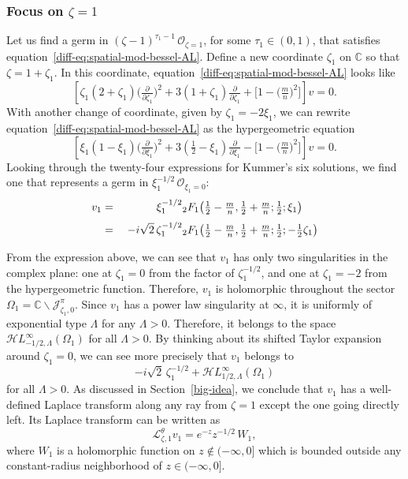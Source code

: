 \documentclass{article}
\newcommand{\singexp}[2]{\mathcal{H}L^\infty_{#1, #2}}
\newcommand{\C}{\mathbb{C}}
\newcommand{\laplace}{\mathcal{L}}
\theoremstyle{definition}
\theoremstyle{plain}
\begin{document}
\subsubsection{Focus on $\zeta = 1$}\label{pos-root-AL}
%
Let us find a germ in $(\zeta-1)^{\tau_1-1}\,\mathcal{O}_{\zeta=1}$, for some $\tau_1 \in (0, 1)$, that satisfies equation~\eqref{diff-eq:spatial-mod-bessel-AL}. Define a new coordinate $\zeta_1$ on $\C$ so that $\zeta = 1 + \zeta_1$. In this coordinate, equation~\eqref{diff-eq:spatial-mod-bessel-AL} looks like
\begin{equation}\label{diff-eq:spatial-mod-bessel-pos-AL}
\left[\zeta_1(2 + \zeta_1) \big(\tfrac{\partial}{\partial \zeta_1}\big)^2 + 3(1 + \zeta_1) \tfrac{\partial}{\partial \zeta_1} + \big[1 - \big(\tfrac{m}{n}\big)^2\big]\right] v = 0.
\end{equation}
With another change of coordinate, given by $\zeta_1 = -2\xi_1$, we can rewrite equation~\eqref{diff-eq:spatial-mod-bessel-AL} as the hypergeometric equation
\begin{equation}\label{diff-eq:hypergeom-pos-AL}
\left[\xi_1 (1 - \xi_1) \big(\tfrac{\partial}{\partial \xi_1}\big)^2 + 3(\tfrac{1}{2} - \xi_1) \tfrac{\partial}{\partial \xi_1} - \big[1 - \big(\tfrac{m}{n}\big)^2\big]\right] v = 0.
\end{equation}
Looking through the twenty-four expressions for Kummer's six solutions, we find one \cite[formula~15.10.12]{dlmf} that represents a germ in $\xi_1^{-1/2}\,\mathcal{O}_{\xi_1=0}$:
\begin{alignat*}{2}
v_1 &=\;& \hphantom{-i\sqrt{2}}\,\xi_1^{-1/2} & {}_2F_1\big(\tfrac{1}{2}-\tfrac{m}{n}, \tfrac{1}{2}+\tfrac{m}{n}; \tfrac{1}{2}; \xi_1\big) \\[1mm]
&=\;& -i\sqrt{2}\,\zeta_1^{-1/2} & {}_2F_1\big(\tfrac{1}{2}-\tfrac{m}{n}, \tfrac{1}{2}+\tfrac{m}{n}; \tfrac{1}{2}; -\tfrac{1}{2}\zeta_1\big)
\end{alignat*}

From the expression above, we can see that $v_1$ has only two singularities in the complex plane: one at $\zeta_1 = 0$ from the factor of $\zeta_1^{-1/2}$, and one at $\zeta_1 = -2$ from the hypergeometric function. Therefore, $v_1$ is holomorphic throughout the sector $\Omega_1 = \C \smallsetminus \mathcal{J}^\pi_{\zeta_1, 0}$. Since $v_1$ has a power law singularity at $\infty$, it is uniformly of exponential type $\Lambda$ for any $\Lambda > 0$. Therefore, it belongs to the space $\singexp{-1/2}{\Lambda}(\Omega_1)$ for all $\Lambda > 0$. By thinking about its shifted Taylor expansion around $\zeta_1 = 0$, we can see more precisely that $v_1$ belongs to
\[ -i\sqrt{2}\,\zeta_1^{-1/2} + \singexp{1/2}{\Lambda}(\Omega_1) \]
for all $\Lambda > 0$. As discussed in Section~\ref{big-idea}, we conclude that $v_1$ has a well-defined Laplace transform along any ray from $\zeta = 1$ except the one going directly left. Its Laplace transform can be written as
\[ \laplace^\theta_{\zeta, 1} v_1 = e^{-z} z^{-1/2}\,W_1, \]
where $W_1$ is a holomorphic function on $z \notin (-\infty, 0]$ which is bounded outside any constant-radius neighborhood of $z \in (-\infty, 0]$.
%
\end{document}
